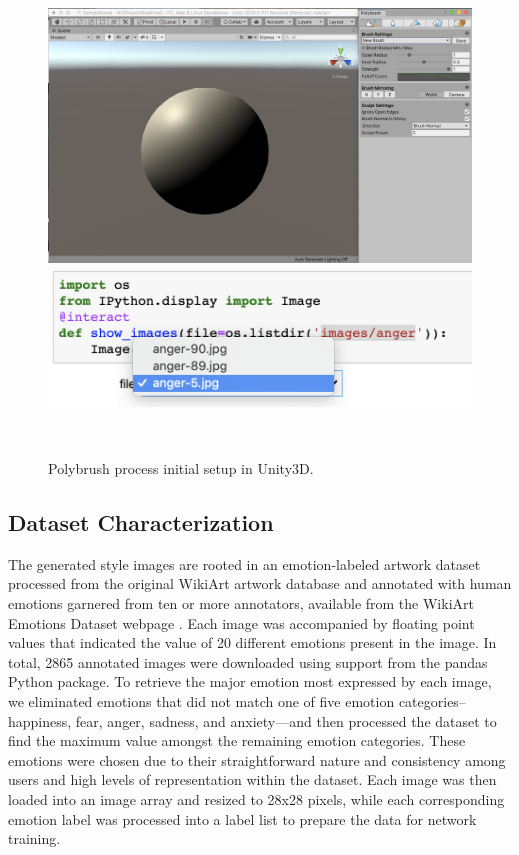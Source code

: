 \documentclass{sigchi}
\begin{document}
\begin{figure}
  \centering
  \includegraphics[width=2\columnwidth]{figures/polybrushstart}
  \includegraphics[width=2\columnwidth]{figures/selection}
  \caption{Polybrush process initial setup in Unity3D.}~\label{fig:figure1}
\end{figure}

\subsection{Dataset Characterization}
The generated style images are rooted in an emotion-labeled artwork dataset processed from the original WikiArt artwork database and annotated with human emotions garnered from ten or more annotators, available from the WikiArt Emotions Dataset webpage \cite{LREC18-ArtEmo}. Each image was accompanied by floating point values that indicated the value of 20 different emotions present in the image. In total, 2865 annotated images were downloaded using support from the pandas Python package. To retrieve the major emotion most expressed by each image, we eliminated emotions that did not match one of five emotion categories-- happiness, fear, anger, sadness, and anxiety—and then processed the dataset to find the maximum value amongst the remaining emotion categories. These emotions were chosen due to their straightforward nature and consistency among users and high levels of representation within the dataset. Each image was then loaded into an image array and resized to 28x28 pixels, while each corresponding emotion label was processed into a label list to prepare the data for network training.
\end{document}
